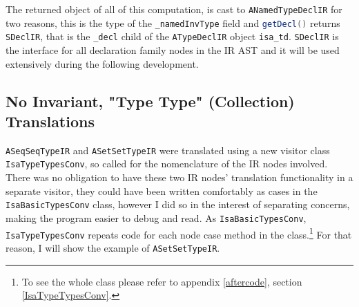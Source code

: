     The returned object of all of this computation, is cast to \lstinline[language=Java]{ANamedTypeDeclIR} for two reasons, this is the type of the \lstinline[language=Java]{_namedInvType} field and \lstinline[language=Java]{getDecl()} returns \lstinline[language=Java]{SDeclIR}, that is the \lstinline[language=Java]{_decl} child of the \lstinline[language=Java]{ATypeDeclIR} object \lstinline[language=Java]{isa_td}. \lstinline[language=Java]{SDeclIR} is the interface for all declaration family nodes in the IR AST and it will be used extensively during the following development.

    \subsection{No Invariant, "Type Type" (Collection) Translations}
    \lstinline[language=Java]{ASeqSeqTypeIR} and \lstinline[language=Java]{ASetSetTypeIR} were translated using a new visitor class \lstinline[language=Java]{IsaTypeTypesConv}, so called for the nomenclature of the IR nodes involved. There was no obligation to have these two IR nodes' translation functionality in a separate visitor, they could have been written comfortably as cases in the \lstinline[language=Java]{IsaBasicTypesConv} class, however I did so in the interest of separating concerns, making the program easier to debug and read. As \lstinline[language=Java]{IsaBasicTypesConv}, \lstinline[language=Java]{IsaTypeTypesConv} repeats code for each node case method in the class.\footnote{To see the whole class please refer to appendix \ref{aftercode}, section \ref{IsaTypeTypesConv}.} For that reason, I will show the example of \lstinline[language=Java]{ASetSetTypeIR}.

